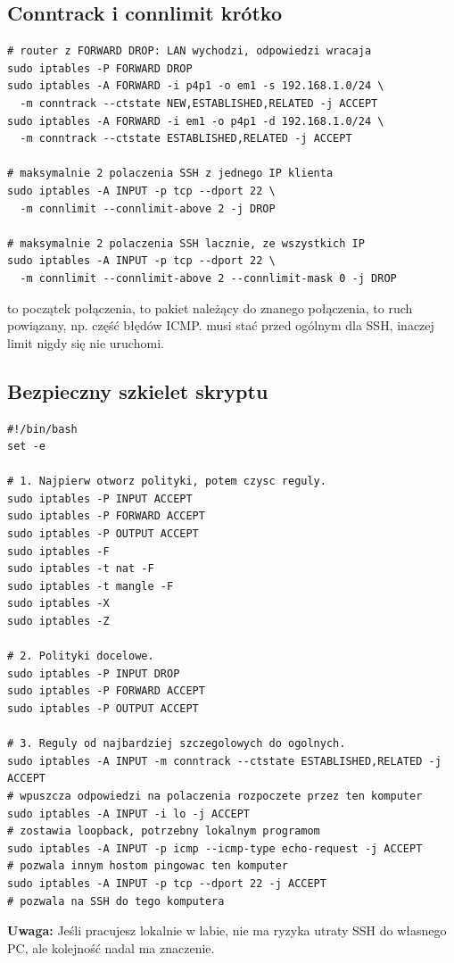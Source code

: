 \documentclass[10pt,a5paper,twoside]{article}
\newcommand{\code}[1]{\texttt{\detokenize{#1}}}
\newcommand{\warn}[1]{\textbf{Uwaga:} #1}
\begin{document}
\subsection{Conntrack i connlimit krótko}
\begin{lstlisting}
# router z FORWARD DROP: LAN wychodzi, odpowiedzi wracaja
sudo iptables -P FORWARD DROP
sudo iptables -A FORWARD -i p4p1 -o em1 -s 192.168.1.0/24 \
  -m conntrack --ctstate NEW,ESTABLISHED,RELATED -j ACCEPT
sudo iptables -A FORWARD -i em1 -o p4p1 -d 192.168.1.0/24 \
  -m conntrack --ctstate ESTABLISHED,RELATED -j ACCEPT

# maksymalnie 2 polaczenia SSH z jednego IP klienta
sudo iptables -A INPUT -p tcp --dport 22 \
  -m connlimit --connlimit-above 2 -j DROP

# maksymalnie 2 polaczenia SSH lacznie, ze wszystkich IP
sudo iptables -A INPUT -p tcp --dport 22 \
  -m connlimit --connlimit-above 2 --connlimit-mask 0 -j DROP
\end{lstlisting}
\code{NEW} to początek połączenia, \code{ESTABLISHED} to pakiet należący do znanego połączenia, \code{RELATED} to ruch powiązany, np. część błędów ICMP. \code{connlimit} musi stać przed ogólnym \code{ACCEPT} dla SSH, inaczej limit nigdy się nie uruchomi.

\subsection{Bezpieczny szkielet skryptu}
\begin{lstlisting}
#!/bin/bash
set -e

# 1. Najpierw otworz polityki, potem czysc reguly.
sudo iptables -P INPUT ACCEPT
sudo iptables -P FORWARD ACCEPT
sudo iptables -P OUTPUT ACCEPT
sudo iptables -F
sudo iptables -t nat -F
sudo iptables -t mangle -F
sudo iptables -X
sudo iptables -Z

# 2. Polityki docelowe.
sudo iptables -P INPUT DROP
sudo iptables -P FORWARD ACCEPT
sudo iptables -P OUTPUT ACCEPT

# 3. Reguly od najbardziej szczegolowych do ogolnych.
sudo iptables -A INPUT -m conntrack --ctstate ESTABLISHED,RELATED -j ACCEPT
# wpuszcza odpowiedzi na polaczenia rozpoczete przez ten komputer
sudo iptables -A INPUT -i lo -j ACCEPT
# zostawia loopback, potrzebny lokalnym programom
sudo iptables -A INPUT -p icmp --icmp-type echo-request -j ACCEPT
# pozwala innym hostom pingowac ten komputer
sudo iptables -A INPUT -p tcp --dport 22 -j ACCEPT
# pozwala na SSH do tego komputera
\end{lstlisting}
\warn{Jeśli pracujesz lokalnie w labie, nie ma ryzyka utraty SSH do własnego PC, ale kolejność nadal ma znaczenie.}
\end{document}
